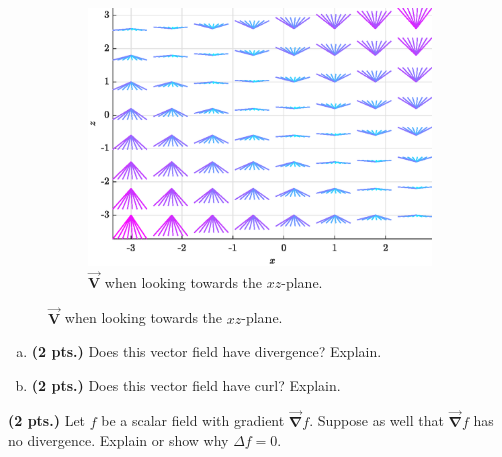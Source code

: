\documentclass[12pt]{amsbook}
\newcommand{\vecfieldV}{\boldsymbol{\vec{V}}}
\newcommand{\grad}{\boldsymbol{\vec{\nabla}}}
\begin{document}
\begin{problem}
\begin{figure}[H]
    \quad
    \begin{subfigure}[b]{0.45\textwidth}
        \centering
        \includegraphics[width=\textwidth]{figures/vecfield_xz}
        \caption{$\vecfieldV$ when looking towards the $xz$-plane.}
    \end{subfigure}
\end{figure}
\begin{enumerate}[(a)]
    \item \textbf{(2 pts.)} Does this vector field have divergence? Explain.
    \item \textbf{(2 pts.)} Does this vector field have curl? Explain.
\end{enumerate}
\end{problem}



\begin{problem}
\textbf{(2 pts.)}  Let $f$ be a scalar field with gradient $\grad f$. Suppose as well that $\grad f$ has no divergence. Explain or show why $\Delta f = 0$.
\end{problem}  
\end{document}
